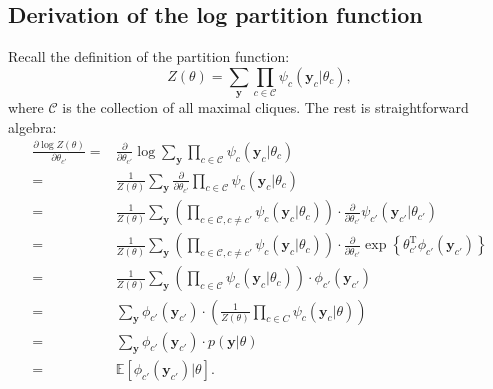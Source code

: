 \documentclass[UTF8]{ctexart}
\begin{document}
\subsection{Derivation of the log partition function}
Recall the definition of the partition function:
$$Z(\theta)=\sum_{\textbf{y}}\prod_{c \in \mathcal{C}}\psi_{c}(\textbf{y}_{c}|\theta_{c}),$$
where $\mathcal{C}$ is the collection of all maximal cliques.
The rest is straightforward algebra:
\begin{align}
\frac{\partial \log Z(\theta)}{\partial \theta_{c'}} = &\frac{\partial}{\partial \theta_{c'}}\log \sum_{\textbf{y}}\prod_{c \in \mathcal{C}}\psi_{c}(\textbf{y}_{c}|\theta_{c}) \nonumber \\
=&\frac{1}{Z(\theta)}\sum_{\textbf{y}}\frac{\partial}{\partial\theta_{c'}}\prod_{c \in \mathcal{C}}\psi_{c}(\textbf{y}_{c}|\theta_{c}) \nonumber \\
=&\frac{1}{Z(\theta)}\sum_{\textbf{y}}\left(\prod_{c \in \mathcal{C},c \neq c'}\psi_{c}(\textbf{y}_{c}|\theta_{c})\right)\cdot\frac{\partial}{\partial\theta_{c'}}\psi_{c'}(\textbf{y}_{c'}|\theta_{c'}) \nonumber \\
=&\frac{1}{Z(\theta)}\sum_{\textbf{y}}\left(\prod_{c \in \mathcal{C},c \neq c'}\psi_{c}(\textbf{y}_{c}|\theta_{c})\right)\cdot\frac{\partial}{\partial\theta_{c'}} \exp\left\{\theta_{c'}^{\text{T}}\phi_{c'}(\textbf{y}_{c'}) \right\} \nonumber \\
=&\frac{1}{Z(\theta)}\sum_{\textbf{y}}\left(\prod_{c \in \mathcal{C}}\psi_{c}(\textbf{y}_{c}|\theta_{c})\right)\cdot\phi_{c'}(\textbf{y}_{c'}) \nonumber \\
=&\sum_{\textbf{y}}\phi_{c'}(\textbf{y}_{c'})\cdot\left(\frac{1}{Z(\theta)}\prod_{c\in C}\psi_{c}(\textbf{y}_{c}|\theta)\right) \nonumber \\
=&\sum_{\textbf{y}}\phi_{c'}(\textbf{y}_{c'})\cdot p(\textbf{y}|\theta) \nonumber \\
=&\mathbb{E}[\phi_{c'}(\textbf{y}_{c'})|\theta]. \nonumber
\end{align}
\end{document}

